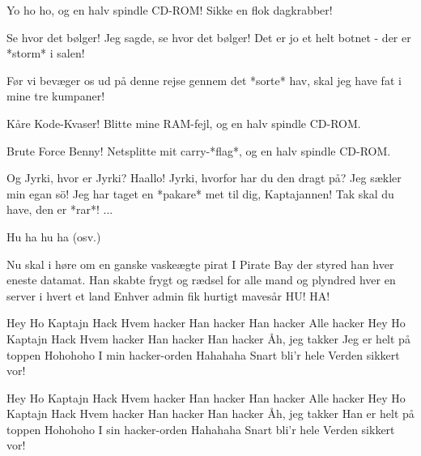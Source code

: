 \documentclass[a4paper,11pt]{article}
\begin{document}
\begin{song}




%
 Yo ho ho, og en halv spindle CD-ROM!
 Sikke en flok dagkrabber!

 Se hvor det bølger! 
 Jeg sagde, se hvor det bølger!
 Det er jo et helt botnet - der er *storm* i salen!

 Før vi bevæger os ud på denne rejse gennem det *sorte* hav, skal jeg have fat i mine tre kumpaner!

 Kåre Kode-Kvaser!
 Blitte mine RAM-fejl, og en halv spindle CD-ROM.

 Brute Force Benny!
 Netsplitte mit carry-*flag*, og en halv spindle CD-ROM.

 Og Jyrki, hvor er Jyrki?
 Haallo!
 Jyrki, hvorfor har du den dragt på?
 Jeg sækler min egan sö!
	Jeg har taget en *pakare* met til dig, Kaptajannen!
 Tak skal du have, den er *rar*!
 ...

%
 Hu ha hu ha (osv.)

%
 Nu skal i høre om en ganske vaskeægte pirat
	I Pirate Bay der styred han hver eneste datamat.
 Han skabte frygt og rædsel for alle mand
	og plyndred hver en server i hvert et land
 Enhver admin fik hurtigt mavesår
 HU! HA!

%
 Hey Ho Kaptajn Hack
 Hvem hacker
 Han hacker 
 Han hacker 
 Alle hacker
 Hey Ho Kaptajn Hack
 Hvem hacker
 Han hacker 
 Han hacker 
 Åh, jeg takker
	Jeg er helt på toppen
 Hohohoho
 I min hacker-orden
 Hahahaha
 Snart bli'r hele Verden sikkert vor!

 Hey Ho Kaptajn Hack
 Hvem hacker
 Han hacker 
 Han hacker 
 Alle hacker
 Hey Ho Kaptajn Hack
 Hvem hacker
 Han hacker 
 Han hacker 
 Åh, jeg takker
 Han er helt på toppen
	Hohohoho
	I sin hacker-orden
	Hahahaha
	Snart bli'r hele Verden sikkert vor!


\end{song}
\end{document}
